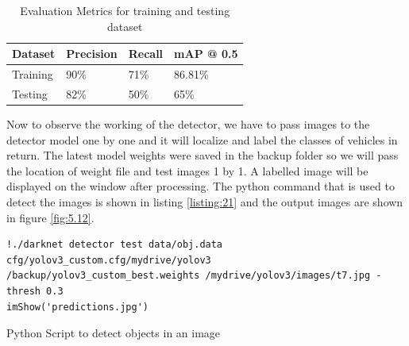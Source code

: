 \begin{table}[H]
    \caption{Evaluation Metrics for training and testing dataset}
    \label{table:5.2}
      \begin{center}
        \scalebox{1.1}
        {\begin{tabular}{|l |l |l |l |}
        \hline
        Dataset   & Precision & Recall &  mAP @ 0.5
        \\ \hline
        Training & 90\% & 71\% & 86.81\%
        \\ \hline
        Testing  & 82\%& 50\% & 65\%
        \\ \hline  
        \end{tabular}}
      \end{center}
\end{table}
\noindent
Now to observe the working of the detector, we have to pass images to the detector model one by one and it will localize and label the classes of vehicles in return. The latest model weights were saved in the backup folder so we will pass the location of weight file and test images 1 by 1. A labelled image will be displayed on the window after processing. The python command that is used to detect the images is shown in listing \ref{listing:21} and the output images are shown in figure \ref{fig:5.12}.
\begin{longlisting}
\begin{verbatim}
!./darknet detector test data/obj.data cfg/yolov3_custom.cfg/mydrive/yolov3
/backup/yolov3_custom_best.weights /mydrive/yolov3/images/t7.jpg -thresh 0.3
imShow('predictions.jpg')
\end{verbatim}
\caption{Python Script to detect objects in an image}
\label{listing:21}
\end{longlisting}
